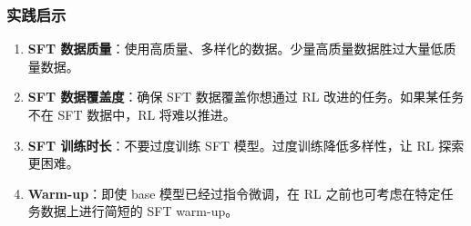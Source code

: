 \subsubsection*{实践启示}
\label{practical-implications}

\begin{enumerate}
  \item \textbf{SFT 数据质量}：使用高质量、多样化的数据。少量高质量数据胜过大量低质量数据。
  \item \textbf{SFT 数据覆盖度}：确保 SFT 数据覆盖你想通过 RL 改进的任务。如果某任务不在 SFT 数据中，RL 将难以推进。
  \item \textbf{SFT 训练时长}：不要过度训练 SFT 模型。过度训练降低多样性，让 RL 探索更困难。
  \item \textbf{Warm-up}：即使 base 模型已经过指令微调，在 RL 之前也可考虑在特定任务数据上进行简短的 SFT warm-up。
\end{enumerate}

